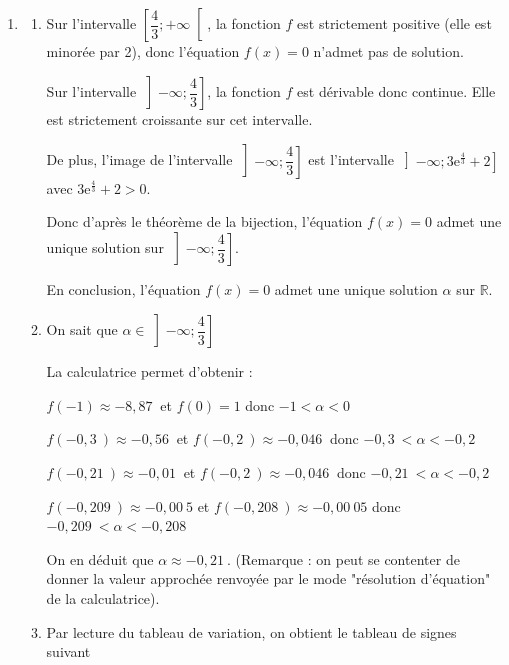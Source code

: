 \documentclass[10pt]{article}
\providecommand{\R}{\mathbb{R}}
\providecommand{\e}{{\mathrm{e}}}
\providecommand{\np}[2][]{{#2~#1}}
\begin{document}
\begin{enumerate}
		\item \begin{enumerate}
			\item Sur l'intervalle $\left[ \dfrac43 ; +\infty \right[$, la fonction $f$ est strictement positive (elle est minorée par 2), donc l'équation $f(x)=0$ n'admet pas de solution.

			Sur l'intervalle $\left] -\infty  ;\dfrac43 \right]$, la fonction $f$ est dérivable donc continue. Elle est strictement croissante sur cet intervalle.

			De plus, l'image de l'intervalle $\left] -\infty  ;\dfrac43 \right]$ est l'intervalle $\left] -\infty  ;3\e^{\frac43}+2 \right]$ avec $3\e^{\frac43}+2 >0$.

			Donc d'après le théorème de la bijection, l'équation $f(x)=0$ admet une unique solution sur $\left] -\infty  ;\dfrac43 \right]$.

			En conclusion, l'équation $f(x)=0$ admet une unique solution $\alpha$ sur $\R$.

			\item On sait que $\alpha \in \left] -\infty  ;\dfrac43 \right]$

			La calculatrice permet d'obtenir :

			$f \left(-1 \right) \approx \np{-8,87}$ et $f \left(0 \right)=1$ donc $-1 < \alpha < 0 $

			$f \left( \np{-0,3} \right) \approx \np{-0,56}$ et $f \left( \np{-0,2} \right) \approx \np{-0,046}$ donc $- \np{0,3} < \alpha < \np{-0,2} $

			$f \left( \np{-0,21} \right) \approx \np{-0,01}$ et $f \left( \np{-0,2} \right) \approx \np{-0,046}$ donc $- \np{0,21} < \alpha < \np{-0,2} $

			$f \left( \np{-0,209} \right) \approx \np{-0,00}5$ et $f \left( \np{-0,208} \right) \approx \np{-0,00}05$ donc $- \np{0,209} < \alpha < \np{-0,208} $

			On en déduit que $\alpha \approx \np{-0,21}$. (Remarque : on peut se contenter de donner la valeur approchée renvoyée par le mode "résolution d'équation" de la calculatrice).

			\item Par lecture du tableau de variation, on obtient le tableau de signes suivant
			\begin{center}
			\end{center}


\end{enumerate}
\end{enumerate}
\end{document}
